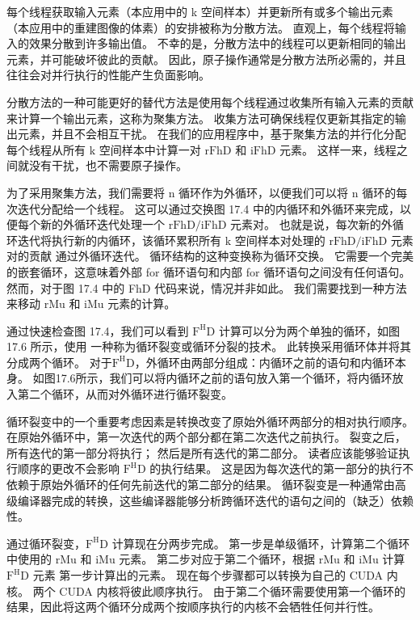 每个线程获取输入元素（本应用中的 k 空间样本）并更新所有或多个输出元素（本应用中的重建图像的体素）的安排被称为分散方法。 直观上，每个线程将输入的效果分散到许多输出值。 不幸的是，分散方法中的线程可以更新相同的输出元素，并可能破坏彼此的贡献。 因此，原子操作通常是分散方法所必需的，并且往往会对并行执行的性能产生负面影响。

分散方法的一种可能更好的替代方法是使用每个线程通过收集所有输入元素的贡献来计算一个输出元素，这称为聚集方法。 收集方法可确保线程仅更新其指定的输出元素，并且不会相互干扰。 在我们的应用程序中，基于聚集方法的并行化分配每个线程从所有 $\mathrm{k}$ 空间样本中计算一对 $\mathrm{rFhD}$ 和 $\mathrm{iFhD}$ 元素。 这样一来，线程之间就没有干扰，也不需要原子操作。

为了采用聚集方法，我们需要将 n 循环作为外循环，以便我们可以将 n 循环的每次迭代分配给一个线程。 这可以通过交换图 17.4 中的内循环和外循环来完成，以便每个新的外循环迭代处理一个 $\mathrm{rFhD} / \mathrm{iFhD}$ 元素对。 也就是说，每次新的外循环迭代将执行新的内循环，该循环累积所有 $\mathrm{k}$ 空间样本对处理的 $\mathrm{rFhD} / \mathrm{iFhD}$ 元素对的贡献 通过外循环迭代。 循环结构的这种变换称为循环交换。 它需要一个完美的嵌套循环，这意味着外部 for 循环语句和内部 for 循环语句之间没有任何语句。 然而，对于图 17.4 中的 FhD 代码来说，情况并非如此。 我们需要找到一种方法来移动 rMu 和 iMu 元素的计算。

通过快速检查图 17.4，我们可以看到 $\mathrm{F}^{\mathrm{H}} \mathrm{D}$ 计算可以分为两个单独的循环，如图 17.6 所示，使用 一种称为循环裂变或循环分裂的技术。 此转换采用循环体并将其分成两个循环。 对于$\mathrm{F}^{\mathrm{H}} \mathrm{D}$，外循环由两部分组成：内循环之前的语句和内循环本身。 如图17.6所示，我们可以将内循环之前的语句放入第一个循环，将内循环放入第二个循环，从而对外循环进行循环裂变。

循环裂变中的一个重要考虑因素是转换改变了原始外循环两部分的相对执行顺序。 在原始外循环中，第一次迭代的两个部分都在第二次迭代之前执行。 裂变之后，所有迭代的第一部分将执行； 然后是所有迭代的第二部分。 读者应该能够验证执行顺序的更改不会影响 $\mathrm{F}^{\mathrm{H}} \mathrm{D}$ 的执行结果。 这是因为每次迭代的第一部分的执行不依赖于原始外循环的任何先前迭代的第二部分的结果。 循环裂变是一种通常由高级编译器完成的转换，这些编译器能够分析跨循环迭代的语句之间的（缺乏）依赖性。

通过循环裂变，$\mathrm{F}^{\mathrm{H}} \mathrm{D}$ 计算现在分两步完成。 第一步是单级循环，计算第二个循环中使用的 $\mathrm{rMu}$ 和 $\mathrm{iMu}$ 元素。 第二步对应于第二个循环，根据 $\mathrm{rMu}$ 和 $\mathrm{iMu}$ 计算 $\mathrm{F}^{\mathrm{H}} \mathrm{D}$ 元素 第一步计算出的元素。 现在每个步骤都可以转换为自己的 CUDA 内核。 两个 CUDA 内核将彼此顺序执行。 由于第二个循环需要使用第一个循环的结果，因此将这两个循环分成两个按顺序执行的内核不会牺牲任何并行性。

